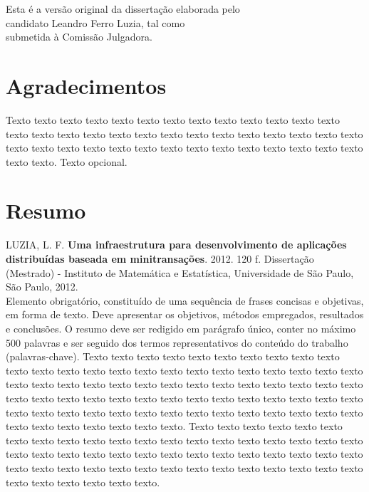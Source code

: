 \documentclass[11pt,twoside,a4paper]{book}
\begin{document}
    \vskip 2cm

    \begin{flushright}
	Esta é a versão original da dissertação elaborada pelo\\
	candidato Leandro Ferro Luzia, tal como \\
	submetida à Comissão Julgadora.
    \end{flushright}

\pagebreak


\chapter*{Agradecimentos}
Texto texto texto texto texto texto texto texto texto texto texto texto texto
texto texto texto texto texto texto texto texto texto texto texto texto texto
texto texto texto texto texto texto texto texto texto texto texto texto texto
texto texto texto texto. Texto opcional.

\chapter*{Resumo}

\noindent LUZIA, L. F. \textbf{Uma infraestrutura para desenvolvimento de aplicações distribuídas baseada em minitransações}. 
2012. 120 f.
Dissertação (Mestrado) - Instituto de Matemática e Estatística,
Universidade de São Paulo, São Paulo, 2012.
\\

Elemento obrigatório, constituído de uma sequência de frases concisas e
objetivas, em forma de texto.  Deve apresentar os objetivos, métodos empregados,
resultados e conclusões.  O resumo deve ser redigido em parágrafo único, conter
no máximo 500 palavras e ser seguido dos termos representativos do conteúdo do
trabalho (palavras-chave). 
Texto texto texto texto texto texto texto texto texto texto texto texto texto
texto texto texto texto texto texto texto texto texto texto texto texto texto
texto texto texto texto texto texto texto texto texto texto texto texto texto
texto texto texto texto texto texto texto texto texto texto texto texto texto
texto texto texto texto texto texto texto texto texto texto texto texto texto
texto texto texto texto texto texto texto texto.
Texto texto texto texto texto texto texto texto texto texto texto texto texto
texto texto texto texto texto texto texto texto texto texto texto texto texto
texto texto texto texto texto texto texto texto texto texto texto texto texto
texto texto texto texto texto texto texto texto texto texto texto texto texto
texto texto.
\\
\end{document}
